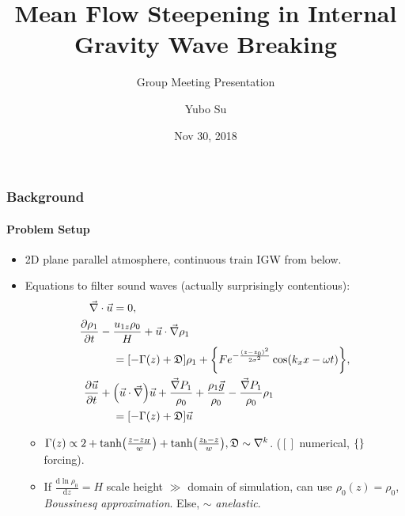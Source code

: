 \documentclass[dvipsnames, 10pt]{beamer}
\newcommand*{\rd}[2]{\frac{\mathrm{d}#1}{\mathrm{d}#2}}
\newcommand*{\pd}[2]{\frac{\partial#1}{\partial#2}}
\DeclarePairedDelimiter\p{\lparen}{\rparen}
\DeclarePairedDelimiter\s{\lbrack}{\rbrack}
\DeclarePairedDelimiter\z{\lbrace}{\rbrace}
\begin{document}
\title[IGWs \& Mean Flow Steepening]{
Mean Flow Steepening in Internal Gravity Wave Breaking}
\subtitle{Group Meeting Presentation}
\author{Yubo Su}
\date{Nov 30, 2018}

\maketitle

\begin{frame}
    \frametitle{Background}
    \framesubtitle{Problem Setup}

    \begin{itemize}
        \item 2D plane parallel atmosphere, continuous train IGW from below.

        \item Equations to filter sound waves (actually surprisingly
            contentious):
            \begin{align}
                \vec{\nabla} \cdot \vec{u} &= 0,\\
                \pd{\rho_1}{t} -{}& \frac{u_{1z} \rho_0}{H}
                    + \vec{u} \cdot \vec{\nabla}\rho_1\nonumber\\
                    &= \s*{-\Gamma(z) + \mathfrak{D}}\rho_1
                    + \z*{Fe^{-\frac{(z - z_0)^2}{2\sigma^2}} \cos\p*{k_xx -
                    \omega t}},\\
                \pd{\vec{u}}{t} +{}& \p*{\vec{u} \cdot \vec{\nabla}}\vec{u}
                    + \frac{\vec{\nabla}P_1}{\rho_0}
                    + \frac{\rho_1 \vec{g}}{\rho_0}
                    - \frac{\vec{\nabla}P_1}{\rho_0}\rho_1\nonumber\\
                    &= \s*{-\Gamma(z) + \mathfrak{D}}\vec{u}
            \end{align}

        \begin{itemize}
            \item $\Gamma(z) \propto 2 + \tanh\p*{\frac{z - z_H}{w}} +
                \tanh\p*{\frac{z_b - z}{w}}, \mathfrak{D} \sim \nabla^{k}$.
                ($[]$ numerical, $\z*{}$ forcing).

            \item If $\rd{\ln \rho_0}{z} = H$ scale height $\gg$ domain of
                simulation, can use $\rho_0(z) = \rho_0$, \emph{Boussinesq
                approximation}. Else, $\sim$ \emph{anelastic}.
        \end{itemize}
    \end{itemize}
\end{frame}
\end{document}
